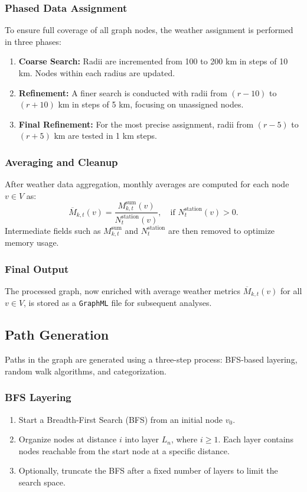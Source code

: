 \documentclass[sigplan,screen]{acmart}
\begin{document}
\subsubsection{Phased Data Assignment}
To ensure full coverage of all graph nodes, the weather assignment is performed in three phases:
\begin{enumerate}
    \item \textbf{Coarse Search:} Radii are incremented from 100 to 200 km in steps of 10 km. Nodes within each radius are updated.
    \item \textbf{Refinement:} A finer search is conducted with radii from \((r-10)\) to \((r+10)\) km in steps of 5 km, focusing on unassigned nodes.
    \item \textbf{Final Refinement:} For the most precise assignment, radii from \((r-5)\) to \((r+5)\) km are tested in 1 km steps.
\end{enumerate}

\subsubsection{Averaging and Cleanup}
After weather data aggregation, monthly averages are computed for each node \( v \in V \) as:
\[
\overline{M}_{k,t}(v) = \frac{M_{k,t}^\text{sum}(v)}{N_t^\text{station}(v)}, \quad \text{if } N_t^\text{station}(v) > 0.
\]
Intermediate fields such as \( M_{k,t}^\text{sum} \) and \( N_t^\text{station} \) are then removed to optimize memory usage.

\subsubsection{Final Output}
The processed graph, now enriched with average weather metrics \(\overline{M}_{k,t}(v)\) for all \(v \in V\), is stored as a \texttt{GraphML} file for subsequent analyses.


\subsection{Path Generation}
Paths in the graph are generated using a three-step process: BFS-based layering, random walk algorithms, and categorization.

\subsubsection{BFS Layering}
\begin{enumerate}
    \item Start a Breadth-First Search (BFS) from an initial node $v_0$.
    \item Organize nodes at distance $i$ into layer $L_n$, where $i \geq 1$. Each layer contains nodes reachable from the start node at a specific distance.
    \item Optionally, truncate the BFS after a fixed number of layers to limit the search space.
\end{enumerate}
\end{document}

